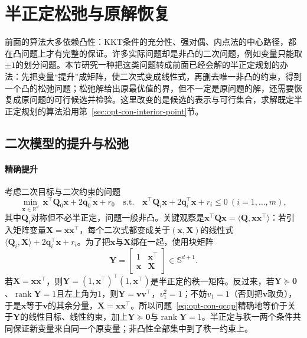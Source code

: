\section{半正定松弛与原解恢复}
\label{sec:opt-con-sdp-relaxation}

前面的算法大多依赖凸性：KKT条件的充分性、强对偶、内点法的中心路径，都在凸问题上才有完整的保证。许多实际问题却是非凸的二次问题，例如变量只能取$\pm1$的划分问题。本节研究一种把这类问题转成前面已经会解的半正定规划的办法：先把变量“提升”成矩阵，使二次式变成线性式，再删去唯一非凸的约束，得到一个凸的松弛问题；松弛解给出原最优值的界，但不一定是原问题的解，还需要恢复成原问题的可行候选并检验。这里改变的是候选的表示与可行集合，求解既定半正定规划的算法沿用第~\ref{sec:opt-con-interior-point}节。

\subsection{二次模型的提升与松弛}
\label{sec:opt-con-lifting}

\paragraph{精确提升}
考虑二次目标与二次约束的问题
\begin{equation}
\label{eq:opt-con-qcqp}
  \min_{\bm x\in\mathbb R^d}\ \bm x^\top\bm Q_0\bm x+2\bm q_0^\top\bm x+r_0\quad\text{s.t.}\quad\bm x^\top\bm Q_i\bm x+2\bm q_i^\top\bm x+r_i\leq0\ (i=1,\dots,m),
\end{equation}
其中$\bm Q_i$对称但不必半正定，问题一般非凸。关键观察是$\bm x^\top\bm Q\bm x=\langle\bm Q,\bm x\bm x^\top\rangle$：若引入矩阵变量$\bm X=\bm x\bm x^\top$，每个二次式都变成关于$(\bm x,\bm X)$的线性式$\langle\bm Q_i,\bm X\rangle+2\bm q_i^\top\bm x+r_i$。为了把$\bm x$与$\bm X$绑在一起，使用块矩阵
\[
  \bm Y=\begin{bmatrix}1&\bm x^\top\\\bm x&\bm X\end{bmatrix}\in\mathbb S^{d+1}.
\]
若$\bm X=\bm x\bm x^\top$，则$\bm Y=(1,\bm x^\top)^\top(1,\bm x^\top)$是半正定的秩一矩阵。反过来，若$\bm Y\succeq\bm0$、$\operatorname{rank}\bm Y=1$且左上角为$1$，则$\bm Y=\bm v\bm v^\top$，$v_1^2=1$；不妨$v_1=1$（否则把$\bm v$取负），于是$\bm x$等于$\bm v$的其余分量，$\bm X=\bm x\bm x^\top$。所以问题~\eqref{eq:opt-con-qcqp}精确地等价于关于$\bm Y$的线性目标、线性约束，加上$\bm Y\succeq\bm0$与$\operatorname{rank}\bm Y=1$。半正定与秩一两个条件共同保证新变量来自同一个原变量；非凸性全部集中到了秩一约束上。

